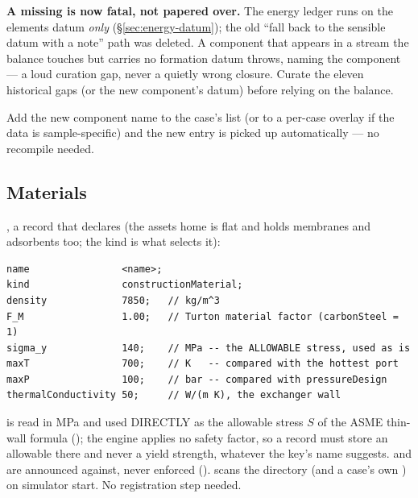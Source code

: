 \documentclass[11pt,a4paper]{article}
\begin{document}
\begin{pitfall}
\textbf{A missing  is now fatal, not papered over.}  The
energy ledger runs on the elements datum \emph{only} (\S\ref{sec:energy-datum});
the old ``fall back to the sensible datum with a note'' path was deleted.  A
component that appears in a stream the balance touches but carries no formation
datum throws, naming the component --- a loud curation gap, never a quietly
wrong closure.  Curate the eleven historical gaps (or the new component's
datum) before relying on the balance.
\end{pitfall}

Add the new component name to the case's 
 list (or to a per-case 
overlay if the data is sample-specific) and the new entry is picked up
automatically --- no recompile needed.

\subsection{Materials}

, a record that declares
 (the assets home is flat and holds
membranes and adsorbents too; the kind is what selects it):

\begin{lstlisting}[language=dict]
name                <name>;
kind                constructionMaterial;
density             7850;   // kg/m^3
F_M                 1.00;   // Turton material factor (carbonSteel = 1)
sigma_y             140;    // MPa -- the ALLOWABLE stress, used as is
maxT                700;    // K   -- compared with the hottest port
maxP                100;    // bar -- compared with pressureDesign
thermalConductivity 50;     // W/(m K), the exchanger wall
\end{lstlisting}

\begin{sloppypar}
 is read in MPa and used DIRECTLY as the allowable stress
$S$ of the ASME thin-wall formula
(); the engine
applies no safety factor, so a record must store an allowable there and
never a yield strength, whatever the key's name suggests. 
and  are announced against, never enforced
().
 scans the directory (and a case's
own ) on simulator start. No registration step
needed.
\end{sloppypar}
\end{document}
